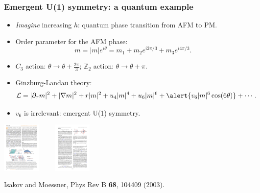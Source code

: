 \documentclass[xcolor=table, aspectratio=1610,ignorenonframetext]{beamer}
\begin{document}
\begin{frame}
  \frametitle{Emergent U(1) symmetry: a quantum example}
  \begin{itemize}
    \item \emph{Imagine} increasing $h$: quantum phase transition from AFM to PM.
    \item Order parameter for the AFM phase:
    \[m=|m|e^{i\theta} = m_1 + m_2e^{i2\pi/3} + m_3e^{i4\pi/3}.\]
    \item $C_3$ action: $\theta\rightarrow\theta+\frac{2\pi}3$;
    $\mathbb Z_2$ action: $\theta\rightarrow\theta+\pi$.
    \item Ginzburg-Landau theory:
    \[\mathcal L = |\partial_\tau m|^2+|\nabla m|^2 + r|m|^2 + u_4|m|^4 + u_6|m|^6+\alert{v_6|m|^6\cos(6\theta)}+\cdots.\]
    \item $v_6$ is irrelevant: emergent U(1) symmetry.
  \end{itemize}
  \begin{center}
    \includegraphics[height=2.5cm]{lattice-afm}~~~~
    \includegraphics[height=2.5cm]{order-param}
  \end{center}
  {\footnotesize Isakov and Moessner, Phys Rev B \textbf{68}, 104409 (2003).}
\end{frame}
\end{document}
